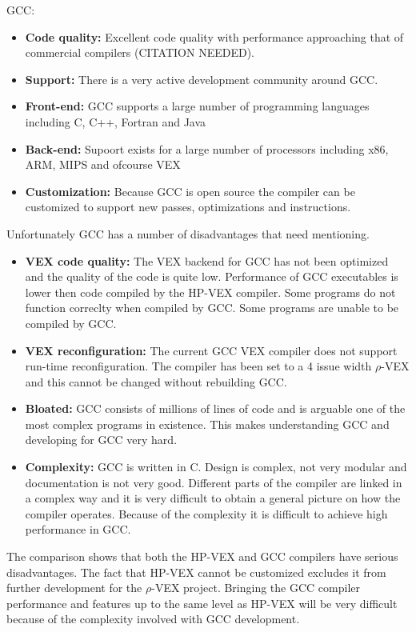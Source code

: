 GCC:
\begin{itemize}
	\item \textbf{Code quality:} Excellent code quality with performance approaching that of commercial compilers (CITATION NEEDED).
	\item \textbf{Support:} There is a very active development community around GCC.
	\item \textbf{Front-end:} GCC supports a large number of programming languages including C, C++, Fortran and Java
	\item \textbf{Back-end:} Supoort exists for a large number of processors including x86, ARM, MIPS and ofcourse VEX
	\item \textbf{Customization:} Because GCC is open source the compiler can be customized to support new passes, optimizations and instructions.
\end{itemize}

Unfortunately GCC has a number of disadvantages that need mentioning.

\begin{itemize}
	\item \textbf{VEX code quality:} The VEX backend for GCC has not been optimized and the quality of the code is quite low. Performance of GCC executables is lower then code compiled by the HP-VEX compiler. Some programs do not function correclty when compiled by GCC. Some programs are unable to be compiled by GCC.
	\item \textbf{VEX reconfiguration:} The current GCC VEX compiler does not support run-time reconfiguration. The compiler has been set to a 4 issue width $\rho$-VEX and this cannot be changed without rebuilding GCC.	
	\item \textbf{Bloated:} GCC consists of millions of lines of code and is arguable one of the most complex programs in existence. This makes understanding GCC and developing for GCC very hard.
	\item \textbf{Complexity:} GCC is written in C. Design is complex, not very modular and documentation is not very good. Different parts of the compiler are linked in a complex way and it is very difficult to obtain a general picture on how the compiler operates. Because of the complexity it is difficult to achieve high performance in GCC.
\end{itemize}

The comparison shows that both the HP-VEX and GCC compilers have serious disadvantages. The fact that HP-VEX cannot be customized excludes it from further development for the $\rho$-VEX project. Bringing the GCC compiler performance and features up to the same level as HP-VEX will be very difficult because of the complexity involved with GCC development.  

